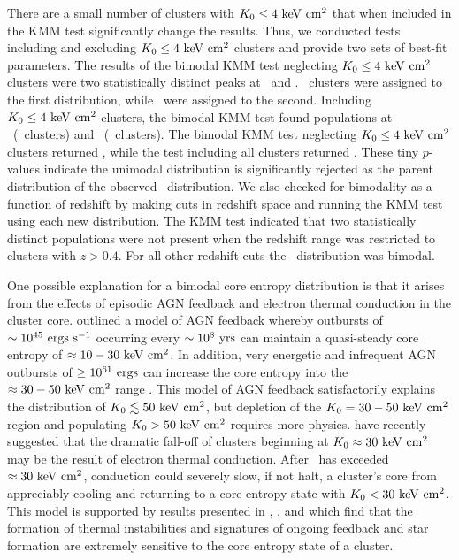 \documentclass[12pt,preprint]{aastex}
\begin{document}
There are a small number of clusters with $K_0 \le 4 \mathrm{\mbox{\ensuremath{\mathrm{~keV}}} \mathrm{\mbox{\ensuremath{\mathrm{~cm}}}^2}}$ that when
included in the KMM test significantly change the results. Thus, we
conducted tests including and excluding $K_0 \le 4 \mathrm{\mbox{\ensuremath{\mathrm{~keV}}} \mathrm{\mbox{\ensuremath{\mathrm{~cm}}}^2}}$ clusters and
provide two sets of best-fit parameters. The results of the bimodal
KMM test neglecting $K_0 \le 4 \mathrm{\mbox{\ensuremath{\mathrm{~keV}}} \mathrm{\mbox{\ensuremath{\mathrm{~cm}}}^2}}$ clusters were two statistically
distinct peaks at \kmma\ and \kmmb. \kmmc\ clusters were assigned to
the first distribution, while \kmmd\ were assigned to the
second. Including $K_0 \le 4 \mathrm{\mbox{\ensuremath{\mathrm{~keV}}} \mathrm{\mbox{\ensuremath{\mathrm{~cm}}}^2}}$ clusters, the bimodal KMM test
found populations at \kmmf\ (\kmmh\ clusters) and
\kmmg\ (\kmmi\ clusters). The bimodal KMM test neglecting $K_0 \le 4
\mathrm{\mbox{\ensuremath{\mathrm{~keV}}} \mathrm{\mbox{\ensuremath{\mathrm{~cm}}}^2}}$ clusters returned \kmme, while the test including all clusters
returned \kmmj. These tiny $p$-values indicate the unimodal
distribution is significantly rejected as the parent distribution of
the observed \kna\ distribution. We also checked for bimodality as a
function of redshift by making cuts in redshift space and running the
KMM test using each new distribution. The KMM test indicated that two
statistically distinct populations were not present when the redshift
range was restricted to clusters with $z > 0.4$. For all other
redshift cuts the \kna\ distribution was bimodal.

One possible explanation for a bimodal core entropy distribution is
that it arises from the effects of episodic AGN feedback and electron
thermal conduction in the cluster core. \citet{agnframework} outlined
a model of AGN feedback whereby outbursts of $\sim 10^{45} \mathrm{\mbox{\ensuremath{\mathrm{~ergs}}} \mathrm{\mbox{\ensuremath{\mathrm{~s}}}^{-1}}}$
occurring every $\sim 10^8 \mbox{\ensuremath{\mathrm{~yrs}}}$ can maintain a quasi-steady core
entropy of $\approx 10-30 \mathrm{\mbox{\ensuremath{\mathrm{~keV}}} \mathrm{\mbox{\ensuremath{\mathrm{~cm}}}^2}}$. In addition, very energetic and
infrequent AGN outbursts of $\geq 10^{61} \mbox{\ensuremath{\mathrm{~ergs}}}$ can increase the core
entropy into the $\approx 30-50 \mathrm{\mbox{\ensuremath{\mathrm{~keV}}} \mathrm{\mbox{\ensuremath{\mathrm{~cm}}}^2}}$ range \citep{agnframework}. This
model of AGN feedback satisfactorily explains the distribution of
$K_0 \lesssim 50 \mathrm{\mbox{\ensuremath{\mathrm{~keV}}} \mathrm{\mbox{\ensuremath{\mathrm{~cm}}}^2}}$, but depletion of the $K_0 = 30-50 \mathrm{\mbox{\ensuremath{\mathrm{~keV}}} \mathrm{\mbox{\ensuremath{\mathrm{~cm}}}^2}}$
region and populating $K_0 > 50 \mathrm{\mbox{\ensuremath{\mathrm{~keV}}} \mathrm{\mbox{\ensuremath{\mathrm{~cm}}}^2}}$ requires more
physics. \citet{conduction} have recently suggested that the dramatic
fall-off of clusters beginning at $K_0 \approx 30 \mathrm{\mbox{\ensuremath{\mathrm{~keV}}} \mathrm{\mbox{\ensuremath{\mathrm{~cm}}}^2}}$ may be the
result of electron thermal conduction. After \kna\ has exceeded
$\approx 30 \mathrm{\mbox{\ensuremath{\mathrm{~keV}}} \mathrm{\mbox{\ensuremath{\mathrm{~cm}}}^2}}$, conduction could severely slow, if not halt, a
cluster's core from appreciably cooling and returning to a core
entropy state with $K_0 < 30 \mathrm{\mbox{\ensuremath{\mathrm{~keV}}} \mathrm{\mbox{\ensuremath{\mathrm{~cm}}}^2}}$. This model is supported by
results presented in \citet{haradent}, \citet{2008arXiv0804.3823G},
and \citet{2008arXiv0802.1864R} which find that the formation of
thermal instabilities and signatures of ongoing feedback and star
formation are extremely sensitive to the core entropy state of a
cluster.
\end{document}
